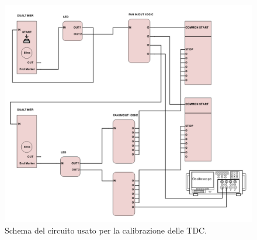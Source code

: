 \documentclass{standalone}
\begin{document}
\begin{figure} [H]
	\begin{center}
		\includegraphics[width=1.\textwidth]{./SCHEMI/Calibrazione.png} %
    \caption{\small Schema del circuito usato per la calibrazione delle TDC.}
		\label{fig:circ-calibrazione}
	\end{center}
\end{figure}
\clearpage
\end{document}
